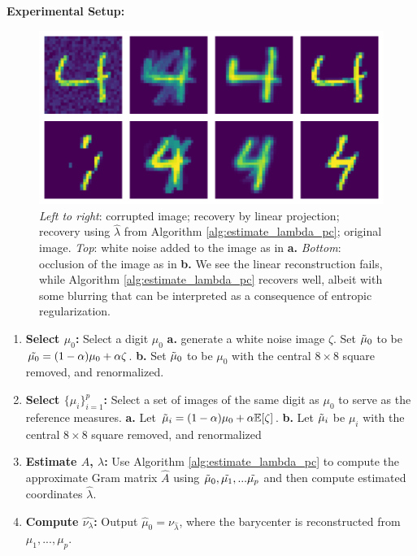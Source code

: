 \documentclass[nohyperref]{article}
\theoremstyle{definition}
\begin{document}
\textbf{Experimental Setup:} 

\begin{figure}[t]
    \centering
    \includegraphics[width=\linewidth]{figures/MNIST_in_out.pdf}
    \caption{\emph{Left to right}: corrupted image; recovery by linear projection; recovery using $\hat{\lambda}$ from Algorithm \ref{alg:estimate_lambda_pc}; original image. \emph{Top}: white noise added to the image as in \textbf{a.} \emph{Bottom}: occlusion of the image as in \textbf{b.}  We see the linear reconstruction fails, while Algorithm \ref{alg:estimate_lambda_pc} recovers well, albeit with some blurring that can be interpreted as a consequence of entropic regularization.}
    \label{fig:MNIST_IO}
\end{figure}


\begin{enumerate}
\setlength \itemsep {-3pt}
    \item \textbf{Select $\mu_{0}$:}  Select a digit $\mu_0$ \textbf{a.} generate a white noise image $\zeta$. Set $\Tilde{\mu}_0$ to be $\Tilde{\mu_0} = (1 - \alpha)\mu_0 + \alpha \zeta$. \textbf{b.} Set $\Tilde{\mu}_0$ to be $\mu_0$ with the central $8 \times 8$ square removed, and renormalized.
    \item \textbf{Select $\{\mu_{i}\}_{i=1}^{p}$:} Select a set of images of the same digit as $\mu_0$ to serve as the reference measures. \textbf{a.} Let $\Tilde{\mu}_i = (1 - \alpha)\mu_0 + \alpha \mathbb{E}[\zeta]$. \textbf{b.} Let $\Tilde{\mu}_i$ be $\mu_i$ with the central $8 \times 8$ square removed, and renormalized
    \item \textbf{Estimate $A$, $\lambda$:} Use Algorithm \ref{alg:estimate_lambda_pc} to compute the approximate Gram matrix $\hat{A}$ using $\Tilde{\mu}_0, \Tilde{\mu_1}, ... \Tilde{\mu_p}$ and then compute estimated coordinates $\hat{\lambda}$.
    \item \textbf{Compute $\hat{\nu_{\lambda}}$:} Output $\hat{\mu}_0 = \nu_{\hat{\lambda}}$, where the barycenter is reconstructed from $\mu_1,...,\mu_p$.
\end{enumerate}
\end{document}
